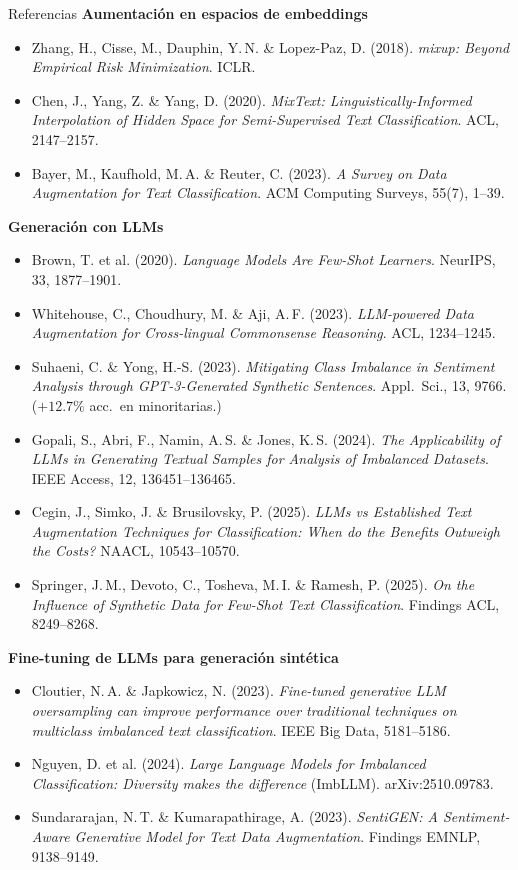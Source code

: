 \begin{frame}[allowframebreaks]{Referencias}
\textbf{Aumentación en espacios de embeddings}
\begin{itemize}\setlength\itemsep{0pt}
  \item Zhang, H., Cisse, M., Dauphin, Y.\,N. \& Lopez-Paz, D. (2018). \textit{mixup: Beyond Empirical Risk Minimization}. ICLR.
  \item Chen, J., Yang, Z. \& Yang, D. (2020). \textit{MixText: Linguistically-Informed Interpolation of Hidden Space for Semi-Supervised Text Classification}. ACL, 2147--2157.
  \item Bayer, M., Kaufhold, M.\,A. \& Reuter, C. (2023). \textit{A Survey on Data Augmentation for Text Classification}. ACM Computing Surveys, 55(7), 1--39.
\end{itemize}

\framebreak

\textbf{Generación con LLMs}
\begin{itemize}\setlength\itemsep{0pt}
  \item Brown, T. et al. (2020). \textit{Language Models Are Few-Shot Learners}. NeurIPS, 33, 1877--1901.
  \item Whitehouse, C., Choudhury, M. \& Aji, A.\,F. (2023). \textit{LLM-powered Data Augmentation for Cross-lingual Commonsense Reasoning}. ACL, 1234--1245.
  \item Suhaeni, C. \& Yong, H.-S. (2023). \textit{Mitigating Class Imbalance in Sentiment Analysis through GPT-3-Generated Synthetic Sentences}. Appl.\ Sci., 13, 9766. ($+12.7\%$ acc.\ en minoritarias.)
  \item Gopali, S., Abri, F., Namin, A.\,S. \& Jones, K.\,S. (2024). \textit{The Applicability of LLMs in Generating Textual Samples for Analysis of Imbalanced Datasets}. IEEE Access, 12, 136451--136465.
  \item Cegin, J., Simko, J. \& Brusilovsky, P. (2025). \textit{LLMs vs Established Text Augmentation Techniques for Classification: When do the Benefits Outweigh the Costs?} NAACL, 10543--10570.
  \item Springer, J.\,M., Devoto, C., Tosheva, M.\,I. \& Ramesh, P. (2025). \textit{On the Influence of Synthetic Data for Few-Shot Text Classification}. Findings ACL, 8249--8268.
\end{itemize}

\textbf{Fine-tuning de LLMs para generación sintética}
\begin{itemize}\setlength\itemsep{0pt}
  \item Cloutier, N.\,A. \& Japkowicz, N. (2023). \textit{Fine-tuned generative LLM oversampling can improve performance over traditional techniques on multiclass imbalanced text classification}. IEEE Big Data, 5181--5186.
  \item Nguyen, D. et al. (2024). \textit{Large Language Models for Imbalanced Classification: Diversity makes the difference} (ImbLLM). arXiv:2510.09783.
  \item Sundararajan, N.\,T. \& Kumarapathirage, A. (2023). \textit{SentiGEN: A Sentiment-Aware Generative Model for Text Data Augmentation}. Findings EMNLP, 9138--9149.
\end{itemize}


\end{frame}
